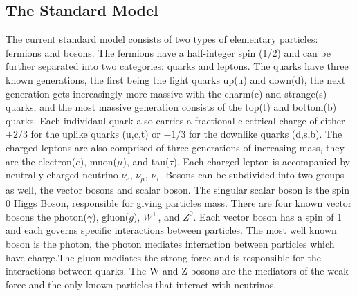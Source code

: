 
\subsection{The Standard Model}
\label{subsec:std_model}
The current standard model consists of two types of elementary particles: fermions and bosons. The fermions have a half-integer spin (1/2) and can be further separated into two categories: quarks and leptons. The quarks have three known generations, the first being the light quarks up(u) and down(d), the next generation gets increasingly more massive with the charm(c) and strange(s) quarks, and the most massive generation consists of the top(t) and bottom(b) quarks. Each individaul quark also carries a fractional electrical charge of either $+2/3$ for the uplike quarks (u,c,t)  or $-1/3$ for the downlike quarks (d,s,b). The charged leptons are also comprised of three generations of increasing mass, they are the electron($e$), muon($\mu$), and tau($\tau$). Each charged lepton is accompanied by neutrally charged  neutrino $\nu_e , \, \nu_\mu , \, \nu_\tau$. Bosons can be subdivided into two groups as well, the vector bosons and scalar boson. The singular scalar boson is the spin 0 Higgs Boson,  responsible for giving particles mass. There are four known vector bosons the photon($\gamma$), gluon($g$), $W^\pm$, and $Z^0$.  Each  vector boson has a spin of 1 and each governs specific interactions between particles. The most well known boson is the photon, the photon mediates interaction between particles which have charge.The gluon mediates the strong force and is responsible for the interactions between quarks. The W and Z bosons are the mediators of the weak force and the only known particles that interact with neutrinos.

